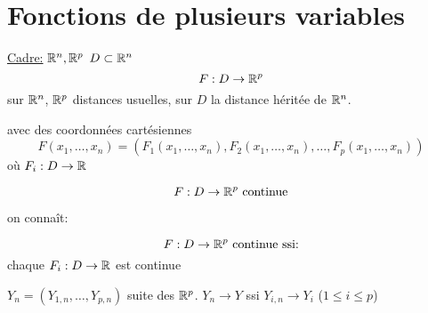 
\chapter{Fonctions de plusieurs variables}
\underline{Cadre:} $\mathbb{R}^n, \mathbb{R}^p$ $D \subset \mathbb{R}^n$
\[
F:D \to \mathbb{R}^p
\] 
sur $\mathbb{R}^n$, $\mathbb{R}^p$ distances usuelles, sur $D$ la distance héritée de  $\mathbb{R}^n$.

avec des coordonnées cartésiennes
\[
F(x_1, \ldots, x_n) = (F_1(x_1, \ldots, x_n), F_2(x_1, \ldots, x_n), \ldots, F_p(x_1, \ldots, x_n))
\] 
où $F_i: D \to \mathbb{R}$

\[
F: D \to \mathbb{R}^p \text{ continue}
\] 

on connaît:
\begin{lemma}
   \[
   F: D \to  \mathbb{R}^p \text{ continue ssi:}
   \]  
   chaque $F_i: D \to \mathbb{R}$ est continue
\end{lemma}
\begin{preuve}
    $Y_n = (Y_{1,n}, \ldots, Y_{p, n})$  suite des $\mathbb{R}^p$. $Y_n \to Y$ ssi $Y_{i,n} \to Y_i$ ($1 \le i \le p$)
\end{preuve}
